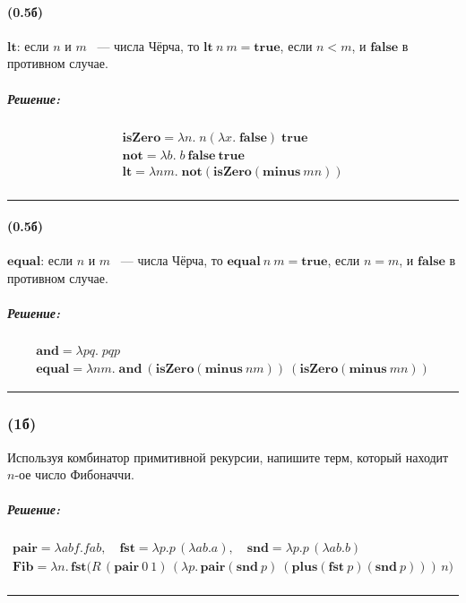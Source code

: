 \documentclass{article}
\newenvironment{proof}{\subparagraph{\hspace{-1em}Решение:\newline}}{\par\noindent\rule{\textwidth}{0.4pt}}
\newcommand{\term}[1]{\mathbf{#1}}
\begin{document}
    \paragraph{(0.5б)}

    $\term{lt}$: если $n$ и $m$ ~--- числа Чёрча, то $\term{lt}~n~m = \term{true}$, если $n < m$, и $\term{false}$ в противном случае.

    \begin{proof}
        \begin{gather*}
            \term{isZero} = \lambda n.\; n (\lambda x.\; \term{false})\; \term{true}\\
            \term{not} = \lambda b.\; b\ \term{false}\ \term{true}\\
            \term{lt} = \lambda n m.\; \term{not}(\term{isZero}(\term{minus}~mn))\\
        \end{gather*}
    \end{proof}

    \paragraph{(0.5б)}

    $\term{equal}$: если $n$ и $m$ ~--- числа Чёрча, то $\term{equal}~n~m = \term{true}$, если $n = m$, и $\term{false}$ в противном случае.

    \begin{proof}
        \begin{gather*}
            \term{and} = \lambda p q.\; p q p\\
            \term{equal} = \lambda n m.\; \term{and}~(\term{isZero}(\term{minus}~n m))~(\term{isZero}(\term{minus}~m n))
        \end{gather*}

    \end{proof}

    \subsubsection{(1б)}

    Используя комбинатор примитивной рекурсии, напишите терм, который
    находит $n$-ое число Фибоначчи.

    \begin{proof}
        \begin{gather*}
            \term{pair} = \lambda a b f. f a b, \quad
            \term{fst} = \lambda p. p\,(\lambda a b. a), \quad
            \term{snd} = \lambda p. p\,(\lambda a b. b)\\
            \term{Fib} =
            \lambda n.\,
            \term{fst}\Big(
            R\,
            (\term{pair}~0~1)\,
            (\lambda p.\, \term{pair}(\term{snd}~p)~(\term{plus}(\term{fst}~p)(\term{snd}~p)))\,
            n
            \Big)\\
        \end{gather*}


    \end{proof}
\end{document}
